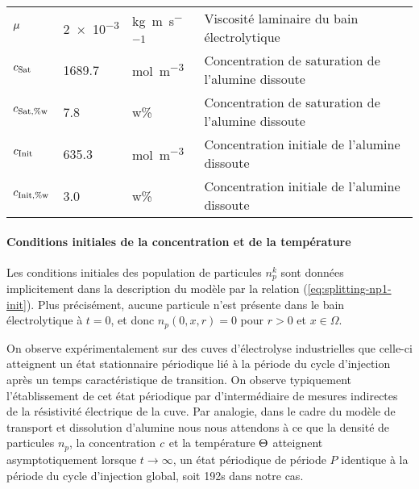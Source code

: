 \begin{table}
\begin{center}
\begin{tabularx}{\textwidth}{@{}lllX@{}}
      $\mu$          & \num{2e-3}       & \si{\kilo\gram\per\meter\per\second}        & Viscosité laminaire du bain électrolytique                      \\
      $c_\text{Sat}$                          & \num{1689.7}     & \si{\mol\per\cubic\meter}                   & Concentration de saturation de l'alumine dissoute               \\
      $c_{\text{Sat},\%\mathrm w}$                        & \num{7.8}        & w\%                                         & Concentration de saturation de l'alumine dissoute               \\
      $c_\text{Init}$                         & \num{635.3}      & \si{\mol\per\cubic\meter}                   & Concentration initiale de l'alumine dissoute                    \\
      $c_{\text{Init},\%\mathrm w}$                       & \num{3.0}        & w\%                                         & Concentration initiale de l'alumine dissoute                    \\
      \bottomrule
    \end{tabularx}
  \end{center}
\end{table}

\paragraph{Conditions initiales de la concentration et de la
  température}
Les conditions initiales des population de particules $n_p^k$ sont
données implicitement dans la description du modèle par la
relation (\ref{eq:splitting-np1-init}). Plus précisément, aucune
particule n'est présente dans le bain électrolytique à $t = 0$, et
donc $n_p(0, x,r) = 0$ pour $r>0$ et $x\in\Omega$.

On observe expérimentalement sur des cuves d'électrolyse industrielles
que celle-ci atteignent un état stationnaire périodique lié à la période
du cycle d'injection après un temps caractéristique de transition. On
observe typiquement l'établissement de cet état périodique par
d'intermédiaire de mesures indirectes de la résistivité électrique de
la cuve. Par analogie, dans le cadre du modèle de transport et
dissolution d'alumine nous nous attendons à ce que la densité de
particules $n_p$, la concentration $c$ et la température
$\Theta$ atteignent asymptotiquement lorsque $t\to\infty$, un état
périodique de période $P$ identique à la période du
cycle d'injection global, soit \num{192}\si{\second} dans notre cas.


